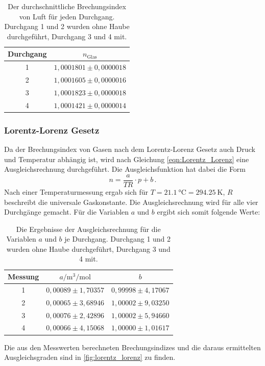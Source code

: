\begin{table}[H]
  \centering
  \caption{Der durchschnittliche Brechungsindex von Luft für jeden Durchgang. Durchgang 1 und 2 wurden ohne Haube durchgeführt, Durchgang 3 und 4 mit.}
  \label{tab:n_luft_mean}
  \begin{tabular}{c c}
    \toprule
    Durchgang & $n_\text{Glas}$ \\
    \midrule
    1    &  $1,0001801 \pm 0,0000018$ \\   
    2    &  $1,0001605 \pm 0,0000016$ \\   
    3    &  $1,0001823 \pm 0,0000018$ \\   
    4    &  $1,0001421 \pm 0,0000014$ \\   
    \bottomrule
  \end{tabular}
\end{table}

\subsubsection{Lorentz-Lorenz Gesetz}
Da der Brechungsindex von Gasen nach dem Lorentz-Lorenz Gesetz auch Druck und Temperatur abhängig ist, wird nach Gleichung \eqref{eqn:Lorentz_Lorenz} eine Ausgleichsrechnung durchgeführt.
Die Ausgleichsfunktion hat dabei die Form
\begin{equation*}
  n = \frac{a}{TR} \cdot p + b \, .
\end{equation*}
Nach einer Temperaturmessung ergab sich für $T = \SI{21.1}{\celsius} = \SI{294.25}{\kelvin}$, $R$ beschreibt die universale Gaskonstante.
Die Ausgleichsrechnung wird für alle vier Durchgänge gemacht.
Für die Variablen $a$ und $b$ ergibt sich somit folgende Werte:
\begin{table}[H]
  \centering
  \caption{Die Ergebnisse der Ausgleichsrechnung für die Variablen $a$ und $b$ je Durchgang. Durchgang 1 und 2 wurden ohne Haube durchgeführt, Durchgang 3 und 4 mit.}
   \begin{tabular}{c c c}
    \toprule
    Messung & $a / \si{\cubic\metre\per\mole}$ & $b$ \\
    \midrule
    1    &  $0,00089 \pm 1,70357$ & $0,99998 \pm 4,17067$ \\   
    2    &  $0,00065 \pm 3,68946$ & $1,00002 \pm 9,03250$ \\   
    3    &  $0,00076 \pm 2,42896$ & $1,00002 \pm 5,94660$ \\   
    4    &  $0,00066 \pm 4,15068$ & $1,00000 \pm 1,01617$ \\
    \bottomrule
  \end{tabular}
\end{table}
\noindent
Die aus den Messwerten berechneten Brechungsindizes und die daraus ermittelten Ausgleichsgraden sind in \autoref{fig:lorentz_lorenz} zu finden.

